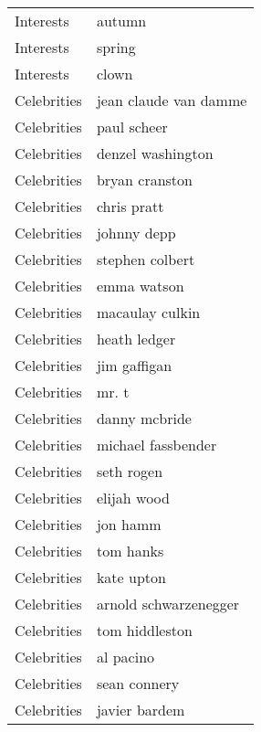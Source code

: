 \begin{supertabular}{l p{0.25\textwidth}}
        Interests &                             autumn \\
        Interests &                             spring \\
        Interests &                              clown \\
      Celebrities &              jean claude van damme \\
      Celebrities &                        paul scheer \\
      Celebrities &                  denzel washington \\
      Celebrities &                     bryan cranston \\
      Celebrities &                        chris pratt \\
      Celebrities &                        johnny depp \\
      Celebrities &                    stephen colbert \\
      Celebrities &                        emma watson \\
      Celebrities &                    macaulay culkin \\
      Celebrities &                       heath ledger \\
      Celebrities &                       jim gaffigan \\
      Celebrities &                              mr. t \\
      Celebrities &                      danny mcbride \\
      Celebrities &                 michael fassbender \\
      Celebrities &                         seth rogen \\
      Celebrities &                        elijah wood \\
      Celebrities &                           jon hamm \\
      Celebrities &                          tom hanks \\
      Celebrities &                         kate upton \\
      Celebrities &              arnold schwarzenegger \\
      Celebrities &                     tom hiddleston \\
      Celebrities &                          al pacino \\
      Celebrities &                       sean connery \\
      Celebrities &                      javier bardem \\

\end{supertabular}
